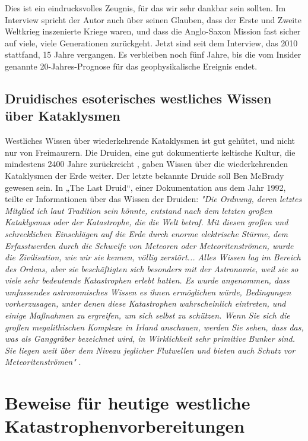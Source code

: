 \documentclass[10pt,twocolumn,letterpaper]{article}
\begin{document}
Dies ist ein eindrucksvolles Zeugnis, für das wir sehr dankbar sein sollten. Im Interview spricht der Autor auch über seinen Glauben, dass der Erste und Zweite Weltkrieg inszenierte Kriege waren, und dass die Anglo-Saxon Mission fast sicher auf viele, viele Generationen zurückgeht. Jetzt sind seit dem Interview, das 2010 stattfand, 15 Jahre vergangen. Es verbleiben noch fünf Jahre, bis die vom Insider genannte 20-Jahres-Prognose für das geophysikalische Ereignis endet.

\subsection{Druidisches esoterisches westliches Wissen über Kataklysmen}

Westliches Wissen über wiederkehrende Kataklysmen ist gut gehütet, und nicht nur von Freimaurern. Die Druiden, eine gut dokumentierte keltische Kultur, die mindestens 2400 Jahre zurückreicht \cite{7}, gaben Wissen über die wiederkehrenden Kataklysmen der Erde weiter. Der letzte bekannte Druide soll Ben McBrady gewesen sein. In „The Last Druid“, einer Dokumentation aus dem Jahr 1992, teilte er Informationen über das Wissen der Druiden: \textit{"Die Ordnung, deren letztes Mitglied ich laut Tradition sein könnte, entstand nach dem letzten großen Kataklysmus oder der Katastrophe, die die Welt betraf. Mit diesen großen und schrecklichen Einschlägen auf die Erde durch enorme elektrische Stürme, dem Erfasstwerden durch die Schweife von Meteoren oder Meteoritenströmen, wurde die Zivilisation, wie wir sie kennen, völlig zerstört... Alles Wissen lag im Bereich des Ordens, aber sie beschäftigten sich besonders mit der Astronomie, weil sie so viele sehr bedeutende Katastrophen erlebt hatten. Es wurde angenommen, dass umfassendes astronomisches Wissen es ihnen ermöglichen würde, Bedingungen vorherzusagen, unter denen diese Katastrophen wahrscheinlich eintreten, und einige Maßnahmen zu ergreifen, um sich selbst zu schützen. Wenn Sie sich die großen megalithischen Komplexe in Irland anschauen, werden Sie sehen, dass das, was als Ganggräber bezeichnet wird, in Wirklichkeit sehr primitive Bunker sind. Sie liegen weit über dem Niveau jeglicher Flutwellen und bieten auch Schutz vor Meteoritenströmen"} \cite{8,9}.

\section{Beweise für heutige westliche Katastrophenvorbereitungen}
\end{document}
